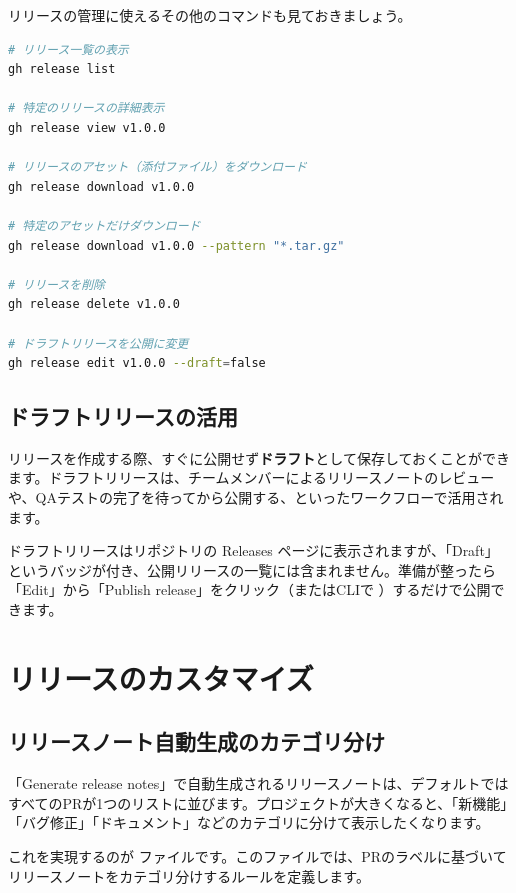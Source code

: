リリースの管理に使えるその他のコマンドも見ておきましょう。

\begin{lstlisting}[language=bash]
# リリース一覧の表示
gh release list

# 特定のリリースの詳細表示
gh release view v1.0.0

# リリースのアセット（添付ファイル）をダウンロード
gh release download v1.0.0

# 特定のアセットだけダウンロード
gh release download v1.0.0 --pattern "*.tar.gz"

# リリースを削除
gh release delete v1.0.0

# ドラフトリリースを公開に変更
gh release edit v1.0.0 --draft=false
\end{lstlisting}

\subsection{ドラフトリリースの活用}

リリースを作成する際、すぐに公開せず\textbf{ドラフト}として保存しておくことができます。ドラフトリリースは、チームメンバーによるリリースノートのレビューや、QAテストの完了を待ってから公開する、といったワークフローで活用されます。

ドラフトリリースはリポジトリの Releases ページに表示されますが、「Draft」というバッジが付き、公開リリースの一覧には含まれません。準備が整ったら「Edit」から「Publish release」をクリック（またはCLIで ）するだけで公開できます。

\section{リリースのカスタマイズ}

\subsection{リリースノート自動生成のカテゴリ分け}

「Generate release notes」で自動生成されるリリースノートは、デフォルトではすべてのPRが1つのリストに並びます。プロジェクトが大きくなると、「新機能」「バグ修正」「ドキュメント」などのカテゴリに分けて表示したくなります。

これを実現するのが  ファイルです。このファイルでは、PRのラベルに基づいてリリースノートをカテゴリ分けするルールを定義します。

